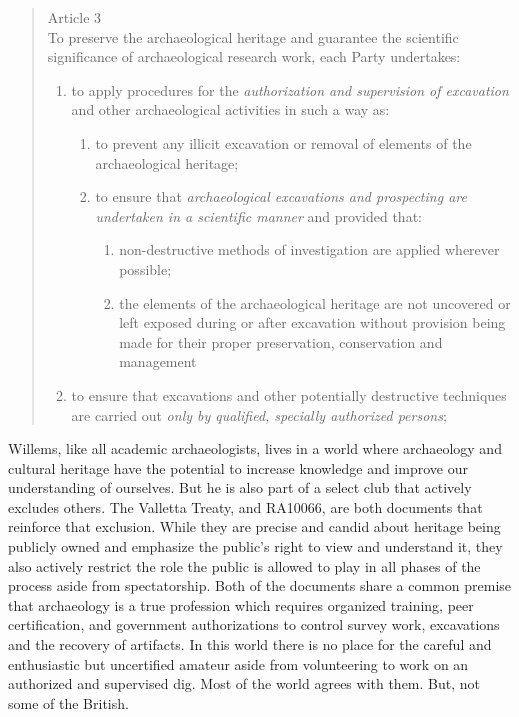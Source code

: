 \begin{quote}
	Article 3\\
	To preserve the archaeological heritage and guarantee the scientific significance of archaeological research work, each Party undertakes:
	\begin{enumerate}
		\item to apply procedures for the \textit{authorization and supervision of excavation} and other archaeological activities in such a way as:  
		\begin{enumerate}
			\item to prevent any illicit excavation or removal of elements of the archaeological heritage; 
			\item to ensure that \textit{archaeological excavations and prospecting are undertaken in a scientific manner} and provided that:
			\begin{enumerate}
				\item non-destructive methods of investigation are applied wherever possible;
				\item the elements of the archaeological heritage are not uncovered or left exposed during or after excavation without provision being made for their proper preservation, conservation and management
			\end{enumerate}
		\end{enumerate}
		\item to ensure that excavations and other potentially destructive techniques are carried out \textit{only by qualified, specially authorized persons}; \parencite{CIA_2001}
	\end{enumerate}
\end{quote}


Willems, like all academic archaeologists, lives in a world where archaeology and cultural heritage have the potential to increase knowledge and improve our understanding of ourselves. But he is also part of a select club that actively excludes others. The Valletta Treaty, and RA10066, are both documents that reinforce that exclusion. While they are precise and candid about heritage being publicly owned and emphasize the public’s right to view and understand it, they also actively restrict the role the public is allowed to play in all phases of the process aside from spectatorship.  Both of the documents share a common premise that archaeology is a true profession which requires organized training, peer certification, and government authorizations to control survey work, excavations and the recovery of artifacts. In this world there is no place for the careful and enthusiastic but uncertified amateur aside from volunteering to work on an authorized and supervised dig. Most of the world agrees with them. But, not some of the British.

